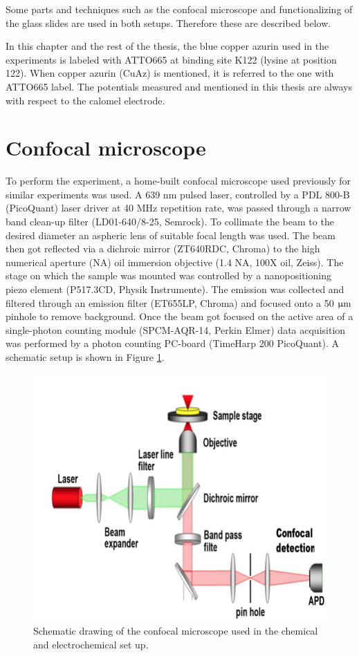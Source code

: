 \documentclass[twoside,single]{lion-msc}
\begin{document}
Some parts and techniques such as the confocal microscope and functionalizing of the glass slides are used in both setups. Therefore these are described below.

In this chapter and the rest of the thesis, the blue copper azurin used in the experiments is  labeled with ATTO665 at binding site K122 (lysine at position 122). When copper azurin (CuAz) is mentioned, it is referred to the one with ATTO665 label.
The potentials measured and mentioned in this thesis are always with respect to the calomel electrode.


\section*{Confocal microscope}  \label{confo_micro}
To perform the experiment, a home-built confocal microscope used previously for similar experiments \cite{Gupta2014} was used. A 639 nm pulsed laser, controlled by a PDL 800-B (PicoQuant) laser driver at 40 MHz repetition rate, was passed through a narrow band clean-up filter (LD01-640/8-25, Semrock). To collimate the beam to the desired diameter an aspheric lens of suitable focal length was used. The beam then got reflected via a dichroic mirror (ZT640RDC, Chroma) to the high numerical aperture (NA) oil immersion objective (1.4 NA, 100X oil, Zeiss). The stage on which the sample was mounted was controlled by a nanopositioning piezo element (P517.3CD, Physik Instrumente). The emission was collected and filtered through an emission filter (ET655LP, Chroma) and focused onto a 50 $\upmu \textup{m}$ pinhole to remove background. Once the beam got focused on the active area of a single-photon counting module (SPCM-AQR-14, Perkin Elmer) data acquisition was performed by a photon counting PC-board (TimeHarp 200 PicoQuant). A schematic setup is shown in Figure \ref{micros}.

\begin{figure}[ht!]
\centering
\includegraphics[width=\textwidth]{schem_micros}
\caption{Schematic drawing of the confocal microscope used in the chemical and electrochemical set up. }
\label{micros}
\end{figure}
\end{document}
